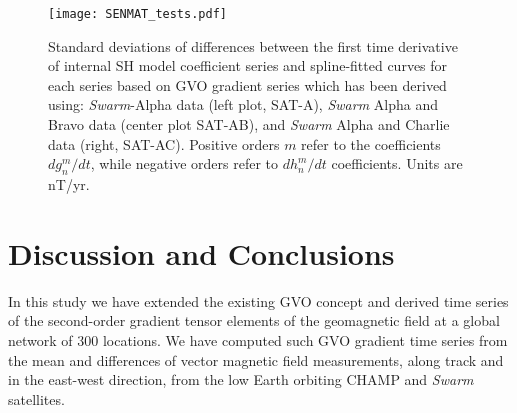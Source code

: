\documentclass[extra,mreferee]{gji}
\begin{document}
\begin{figure}
\centerline{\texttt{[image: SENMAT\_tests.pdf]}}
\caption{Standard deviations of differences between the first time derivative of internal SH model coefficient series and spline-fitted curves for each series based on GVO gradient series which has been derived using: {\it Swarm}-Alpha data (left plot, SAT-A), {\it Swarm} Alpha and Bravo data (center plot SAT-AB), and {\it Swarm} Alpha and Charlie data (right, SAT-AC). Positive orders $m$ refer to the coefficients $dg_n^m/dt$, while negative orders refer to $dh_n^m/dt$ coefficients. Units are nT/yr.}	
\label{Fig:16}
\end{figure}

\section{Discussion and Conclusions}
\label{sec:6}
In this study we have extended the existing GVO concept and derived time series of the second-order gradient tensor elements of the geomagnetic field at a global network of 300 locations. We have computed such GVO gradient time series from the mean and differences of vector magnetic field measurements, along track and in the east-west direction, from the low Earth orbiting CHAMP and {\it Swarm} satellites.
\end{document}
